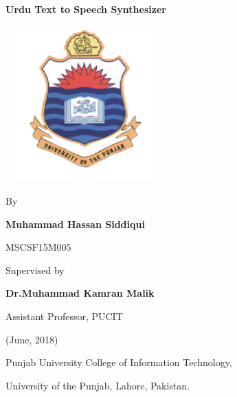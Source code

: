 


\begin{center}
\Large{\textbf{Urdu Text to Speech Synthesizer}}

\end{center}
\bigskip

\begin{center}
    

\includegraphics[width=6cm, height=6cm]{a.PNG}
\end{center}

\begin{center}
    

    By
    
\bigskip    
\large{\textbf{Muhammad Hassan Siddiqui}}

\bigskip
\large{MSCSF15M005}

\bigskip
Supervised by

\bigskip
\large{\textbf{Dr.Muhammad Kamran Malik}}


\bigskip
Assistant Professor, PUCIT

\bigskip
(June, 2018)

\bigskip
Punjab University College of Information Technology,

\bigskip
University of the Punjab, Lahore, Pakistan. 

\end{center}

